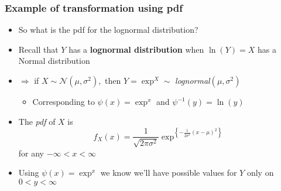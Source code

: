 \documentclass[notes=show,smaller,handout]{beamer}\usepackage[]{graphicx}\usepackage[]{color}
\newcommand{\N}{\mathcal{N}}
\newenvironment{stepitemize}{\begin{itemize}[<+->]}{\end{itemize} }
\begin{document}
\begin{frame}%

\frametitle{Example of transformation using pdf}

\begin{example}
\begin{stepitemize}
\item So what is the pdf for the lognormal distribution?

\item Recall that $Y$ has a \textbf{lognormal distribution} when $\ln \left(
Y\right) =X$ has a Normal distribution

\item $\Rightarrow $ if $X\sim \N\left( \mu ,\sigma ^{2}\right) ,$ then $%
Y=\exp^X\sim $ \emph{lognormal}$\left( \mu ,\sigma ^{2}\right) $

\begin{stepitemize}
\item Corresponding to $\psi \left( x\right) =\exp^x$ and $\psi
^{-1}\left( y\right) =\ln (y)$
\end{stepitemize}

\item The \emph{pdf} of $X$ is
\begin{equation*}
f_{X}\left( x\right) =\frac{1}{\sqrt{2\pi \sigma ^{2}}}\exp^{ \left\{ -\frac{1%
}{2\sigma ^{2}}\left( x-\mu \right) ^{2}\right\}}
\end{equation*}%
for any $-\infty <x<\infty $

\item Using $\psi \left( x\right) =\exp^x$ we know we'll have possible
values for $Y$ only on $0<y<\infty $
\end{stepitemize}
\end{example}
\end{frame}%
\end{document}
